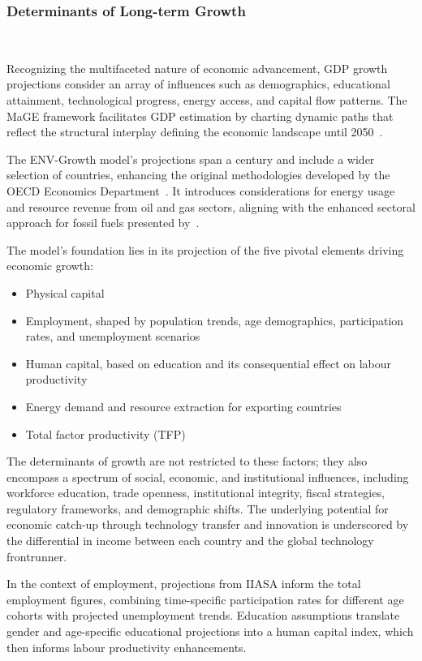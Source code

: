 \subsubsection{Determinants of Long-term Growth}~\cite{fontagne2022gdp, oecd2021gdpmethod}


Recognizing the multifaceted nature of economic advancement, GDP growth projections consider an array of influences such as demographics, educational attainment, technological progress, energy access, and capital flow patterns. The MaGE framework facilitates GDP estimation by charting dynamic paths that reflect the structural interplay defining the economic landscape until 2050~\cite{fontagne2022gdp}.

The ENV-Growth model's projections span a century and include a wider selection of countries, enhancing the original methodologies developed by the OECD Economics Department~\cite{duval2010gdp, oecd2012gdp}. It introduces considerations for energy usage and resource revenue from oil and gas sectors, aligning with the enhanced sectoral approach for fossil fuels presented by~\cite{chateau2012gdp}.


The model's foundation lies in its projection of the five pivotal elements driving economic growth:

\begin{itemize}
  \item Physical capital
  \item Employment, shaped by population trends, age demographics, participation rates, and unemployment scenarios
  \item Human capital, based on education and its consequential effect on labour productivity
  \item Energy demand and resource extraction for exporting countries
  \item Total factor productivity (TFP)
\end{itemize}

The determinants of growth are not restricted to these factors; they also encompass a spectrum of social, economic, and institutional influences, including workforce education, trade openness, institutional integrity, fiscal strategies, regulatory frameworks, and demographic shifts. The underlying potential for economic catch-up through technology transfer and innovation is underscored by the differential in income between each country and the global technology frontrunner.

In the context of employment, projections from IIASA inform the total employment figures, combining time-specific participation rates for different age cohorts with projected unemployment trends. Education assumptions translate gender and age-specific educational projections into a human capital index, which then informs labour productivity enhancements.

